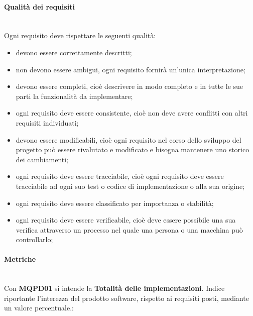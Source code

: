\paragraph{Qualità dei requisiti}\label{2.2.3.1.7}\mbox{}\\
Ogni requisito deve rispettare le seguenti qualità:
\begin{itemize}
	\item devono essere correttamente descritti;
	\item non devono essere ambigui, ogni requisito fornirà un'unica interpretazione;
	\item devono essere completi, cioè descrivere in modo completo e in tutte le sue parti la funzionalità da implementare;
	\item ogni requisito deve essere consistente, cioè non deve avere conflitti con altri requisiti individuati;
	\item devono essere modificabili, cioè ogni requisito nel corso dello sviluppo del progetto può essere rivalutato e modificato e bisogna mantenere uno storico dei cambiamenti;
	\item ogni requisito deve essere tracciabile, cioè ogni requisito deve essere tracciabile ad ogni suo test o codice di implementazione o alla sua origine;
	\item ogni requisito deve essere classificato per importanza o stabilità;
	\item ogni requisito deve essere verificabile, cioè deve essere possibile una sua verifica attraverso un processo nel quale una persona o una macchina può controllarlo;
\end{itemize}

\paragraph{Metriche}\label{2.2.3.1.8}\mbox{}\\
Con \textbf{MQPD01} si intende la \textbf{Totalità delle implementazioni}. Indice riportante l'interezza del prodotto software, rispetto ai requisiti posti, mediante un valore percentuale.:

